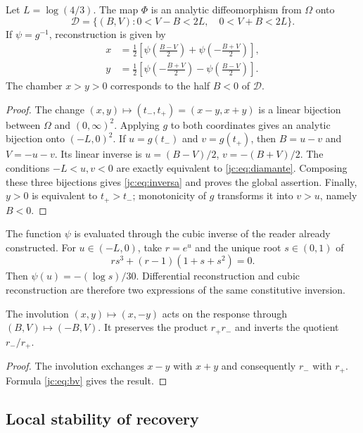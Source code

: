 \begin{theorem}
\label{jc:thm:global} Let $L=\log(4/3)$. The map $\Phi$ is an analytic diffeomorphism from $\Omega$ onto
\begin{equation}
\mathcal D=\{(B,V):0<V-B<2L,\quad0<V+B<2L\}.
\label{jc:eq:diamante}
\end{equation}
If $\psi=g^{-1}$, reconstruction is given by
\begin{align}
x&=\frac12\left[\psi\!\left(\frac{B-V}{2}\right)
                   +\psi\!\left(-\frac{B+V}{2}\right)\right],\\
y&=\frac12\left[\psi\!\left(-\frac{B+V}{2}\right)
                   -\psi\!\left(\frac{B-V}{2}\right)\right].
\label{jc:eq:inversa}
\end{align}
The chamber $x>y>0$ corresponds to the half $B<0$ of $\mathcal D$.
\end{theorem}
\begin{proof}
The change $(x,y)\mapsto(t_-,t_+)=(x-y,x+y)$ is a linear bijection between $\Omega$ and $(0,\infty)^2$. Applying $g$ to both coordinates gives an analytic bijection onto $(-L,0)^2$. If $u=g(t_-)$ and $v=g(t_+)$, then $B=u-v$ and $V=-u-v$. Its linear inverse is $u=(B-V)/2$, $v=-(B+V)/2$. The conditions $-L<u,v<0$ are exactly equivalent to \eqref{jc:eq:diamante}. Composing these three bijections gives \eqref{jc:eq:inversa} and proves the global assertion. Finally, $y>0$ is equivalent to $t_+>t_-$; monotonicity of $g$ transforms it into $v>u$, namely $B<0$.
\end{proof}

The function $\psi$ is evaluated through the cubic inverse of the reader already constructed. For $u\in(-L,0)$, take $r=e^u$ and the unique root $s\in(0,1)$ of
\[
rs^3+(r-1)(1+s+s^2)=0.
\]
Then $\psi(u)=-(\log s)/30$. Differential reconstruction and cubic reconstruction are therefore two expressions of the same constitutive inversion.

\begin{corollary}
The involution $(x,y)\mapsto(x,-y)$ acts on the response through $(B,V)\mapsto(-B,V)$. It preserves the product $r_+r_-$ and inverts the quotient $r_-/r_+$.
\end{corollary}
\begin{proof}
The involution exchanges $x-y$ with $x+y$ and consequently $r_-$ with $r_+$. Formula \eqref{jc:eq:bv} gives the result.
\end{proof}

\subsection{Local stability of recovery}


